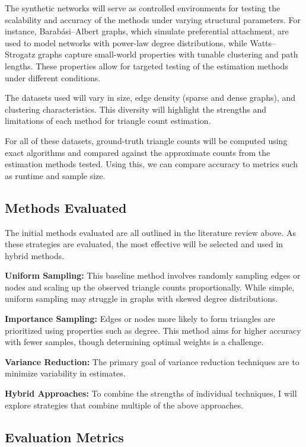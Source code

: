 \documentclass[11pt]{article}
\begin{document}
The synthetic networks will serve as controlled environments for testing the scalability and accuracy of the methods under varying structural parameters.
For instance, Barabási–Albert graphs, which simulate preferential attachment, are used to model networks with power-law degree distributions, while Watts–Strogatz graphs capture small-world properties with tunable clustering and path lengths.
These properties allow for targeted testing of the estimation methods under different conditions.

The datasets used will vary in size, edge density (sparse and dense graphs), and clustering characteristics.
This diversity will highlight the strengths and limitations of each method for triangle count estimation.

For all of these datasets, ground-truth triangle counts will be computed using exact algorithms and compared against the approximate counts from the estimation methods tested.
Using this, we can compare accuracy to metrics such as runtime and sample size.

\subsection{Methods Evaluated}

The initial methods evaluated are all outlined in the literature review above.
As these strategies are evaluated, the most effective will be selected and used in hybrid methods.

\textbf{Uniform Sampling:}
This baseline method involves randomly sampling edges or nodes and scaling up the observed triangle counts proportionally.
While simple, uniform sampling may struggle in graphs with skewed degree distributions.

\textbf{Importance Sampling:}
Edges or nodes more likely to form triangles are prioritized using properties such as degree.
This method aims for higher accuracy with fewer samples, though determining optimal weights is a challenge.

\textbf{Variance Reduction:}
The primary goal of variance reduction techniques are to minimize variability in estimates.

\textbf{Hybrid Approaches:}
To combine the strengths of individual techniques, I will explore strategies that combine multiple of the above approaches.

\subsection{Evaluation Metrics}
\end{document}
